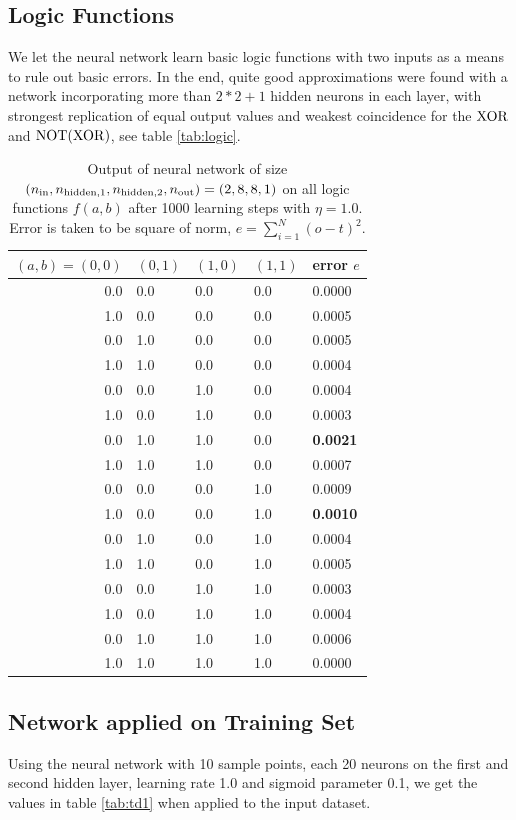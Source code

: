 \documentclass[useAMS,usenatbib]{mn2e}
\begin{document}
\subsection{Logic Functions}
We let the neural network learn basic logic functions with two inputs
as a means to rule out basic errors. In the end, quite good
approximations were found with a network incorporating more than
$2*2+1$ hidden neurons in each layer, with strongest replication of
equal output values and weakest coincidence for the $\rm XOR$ and
${\rm NOT}({\rm XOR})$, see table \ref{tab:logic}.
%
\begin{table}\label{tab:logic}
\begin{center}
\begin{tabular}{rllll}\hline\hline
$(a,b)=(0,0)$&$(0,1)$&$(1,0)$&$(1,1)$&error $e$\\
\hline
0.0 & 0.0 & 0.0 & 0.0 & 0.0000\\
1.0 & 0.0 & 0.0 & 0.0 & 0.0005\\
0.0 & 1.0 & 0.0 & 0.0 & 0.0005\\
1.0 & 1.0 & 0.0 & 0.0 & 0.0004\\
0.0 & 0.0 & 1.0 & 0.0 & 0.0004\\
1.0 & 0.0 & 1.0 & 0.0 & 0.0003\\
0.0 & 1.0 & 1.0 & 0.0 & {\bf 0.0021}\\
1.0 & 1.0 & 1.0 & 0.0 & 0.0007\\
0.0 & 0.0 & 0.0 & 1.0 & 0.0009\\
1.0 & 0.0 & 0.0 & 1.0 & {\bf 0.0010}\\
0.0 & 1.0 & 0.0 & 1.0 & 0.0004\\
1.0 & 1.0 & 0.0 & 1.0 & 0.0005\\
0.0 & 0.0 & 1.0 & 1.0 & 0.0003\\
1.0 & 0.0 & 1.0 & 1.0 & 0.0004\\
0.0 & 1.0 & 1.0 & 1.0 & 0.0006\\
1.0 & 1.0 & 1.0 & 1.0 & 0.0000\\
\hline
\end{tabular}
\end{center}

\caption{\label{tab:logical} Output of neural network of size $(n_{\rm in},n_{\rm hidden,1},n_{\rm hidden,2},n_{\rm out})=(2,8,8,1)$ on all logic functions $f(a,b)$ after 1000 learning steps with $\eta=1.0$. Error is taken to be square of norm, $e=\sum_{i=1}^N(o-t)^2$.}
\end{table}
%
\subsection{Network applied on Training Set}
Using the neural network with 10 sample points, each 20 neurons on the
first and second hidden layer, learning rate 1.0 and sigmoid parameter
0.1, we get the values in table \ref{tab:td1} when applied to the
input dataset.
\end{document}

